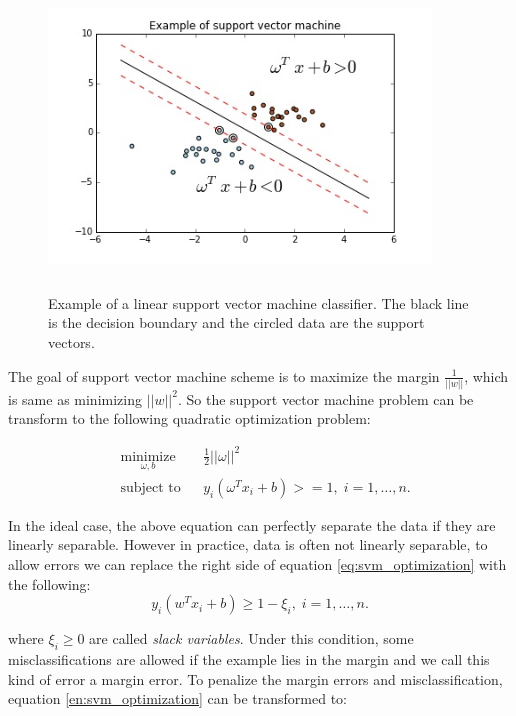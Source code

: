 \begin{figure}[hbtp]
	\begin{center}
		\includegraphics[width=4in,height=3.2in]{figures/svm_example.jpg}
	\end{center}
	\caption{Example of a linear support vector machine classifier. The black line is the decision boundary and the circled data are the support vectors.} \label{fig:svm_example}
\end{figure}
The goal of support vector machine scheme is to maximize the margin $\frac{1}{||w||}$, which is same as minimizing $||w||^2$. So the support vector machine problem can be transform to the following quadratic optimization problem:

\begin{equation}\label{eq:svm_optimization}
\begin{aligned}
& \underset{\omega,b}{\text{minimize}}
& &\frac{1}{2}||\omega||^2\\
& \text{subject to}
& & y_i(\omega^Tx_i+b)>=1, \; i = 1, \ldots, n.
\end{aligned}
\end{equation}

In the ideal case, the above equation can perfectly separate the data if they are linearly separable. However in practice, data is often not linearly separable, to allow errors we can replace the right side of equation \ref{eq:svm_optimization} with the following:
\begin{equation}
y_i(w^Tx_i+b)\geq1-\xi_i,\; i=1,\dots,n.
\end{equation}

where $\xi_i\geq0$ are called \textit{slack variables}. Under this condition, some misclassifications are allowed if the example lies in the margin and we call this kind of error a margin error. To penalize the margin errors and misclassification, equation \ref{en:svm_optimization} can be transformed to:
 
